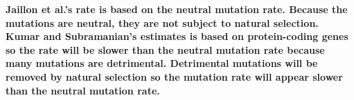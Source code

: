 \documentclass[11pt, addpoints, hidelinks]{exam}
\begin{document}
\begin{questions}
\ifprintanswers\vspace*{\baselineskip}
{\bfseries Jaillon et al.'s rate is based on the neutral mutation rate. Because the mutations are neutral, they are not subject to natural selection. Kumar and Subramanian's estimates is based on protein-coding genes so the rate will be slower than the neutral mutation rate because many mutations are detrimental. Detrimental mutations will be removed by natural selection so the mutation rate will appear slower than the neutral mutation rate.}
\else
\fi

\end{questions}
\end{document}
